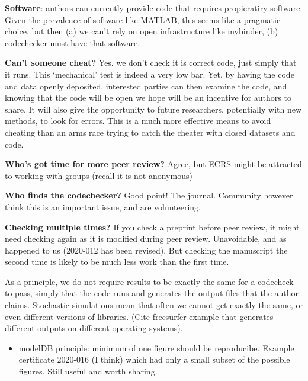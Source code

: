 \documentclass[12pt]{article}
\begin{document}
\textbf{Software}: authors can currently provide code that requires
propieratiry software. Given the prevalence of software like MATLAB,
this seems like a pragmatic choice, but then (a) we can't rely on open
infrastructure like mybinder, (b) codechecker must have that software.

\textbf{Can't someone cheat?} Yes. we don't check it is correct code,
just simply that it runs. This `mechanical' test is indeed a very low bar.
Yet, by having the code and data openly deposited, interested parties can
then examine the code, and knowing that the code will be open we hope will
be an incentive for authors to share. It will also give the opportunity 
to future researchers, potentially with new methods, to look for errors.
This is a much more effective means to avoid cheating than an arms race
trying to catch the cheater with closed datasets and code.

\textbf{Who's got time for more peer review?} Agree, but ECRS might be
attracted to working with groups (recall it is not anonymous)

\textbf{Who finds the codechecker?} Good point! The journal. Community
however think this is an important issue, and are volunteering.

\textbf{Checking multiple times?}  If you check a preprint before peer
review, it might need checking again as it is modified during peer
review.  Unavoidable, and as happened to us (2020-012 has been
revised).  But checking the manuscript the second time is likely to be
much less work than the first time.

As a principle, we do not require results to be exactly the same for a
codecheck to pass, simply that the code runs and generates the output
files that the author claims. Stochastic simulations mean that often
we cannot get exactly the same, or even different versions of
libraries.  (Cite freesurfer example \cite{Gronenschild2012-pp} that
generates different outputs on different operating systems).

\begin{itemize}
\item modelDB principle: minimum of one figure should be reproducibe.
  Example certificate 2020-016 (I think) which had only a small subset
  of the possible figures. Still useful and worth sharing.
\end{itemize}
\end{document}
